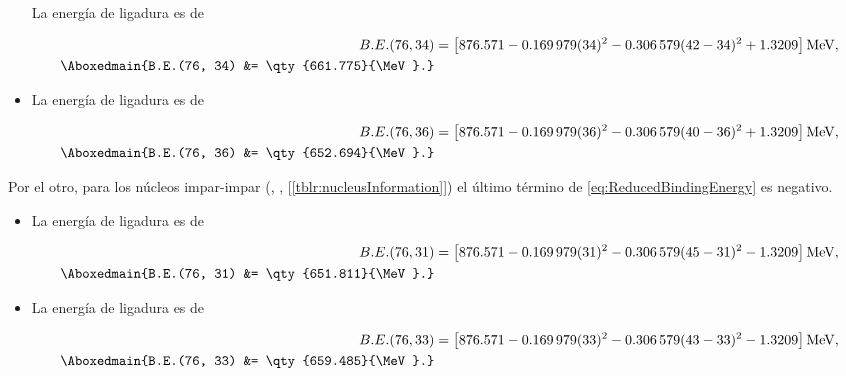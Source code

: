 \documentclass[./../main.tex]{subfiles}
\begin{document}
\begin{exercise}
\begin{solution}
\begin{itemize}
                La energía de ligadura es de

                \begin{align*}
                    B.E.(76, 34) &= \left[\num{876.571} - \num{0.169979}(34)^{2} - \num{0.306579}(42 - 34)^{2} + \num{1.3209}\right]\unit{\MeV},\\
                    \Aboxedmain{B.E.(76, 34) &= \qty{661.775}{\MeV}.}
                \end{align*}
                
                \item {}
                
                La energía de ligadura es de

                \begin{align*}
                    B.E.(76, 36) &= \left[\num{876.571} - \num{0.169979}(36)^{2} - \num{0.306579}(40 - 36)^{2} + \num{1.3209}\right]\unit{\MeV},\\
                    \Aboxedmain{B.E.(76, 36) &= \qty{652.694}{\MeV}.}
                \end{align*}
            \end{itemize}

            Por el otro, para los núcleos impar-impar (, ,  [\cref*{tblr:nucleusInformation}]) el último término de \cref{eq:ReducedBindingEnergy} es negativo.

            \begin{itemize}
                \item {}
                
                La energía de ligadura es de

                \begin{align*}
                    B.E.(76, 31) &= \left[\num{876.571} - \num{0.169979}(31)^{2} - \num{0.306579}(45 - 31)^{2} - \num{1.3209}\right]\unit{\MeV},\\
                    \Aboxedmain{B.E.(76, 31) &= \qty{651.811}{\MeV}.}
                \end{align*}
                
                \item {}
                
                La energía de ligadura es de

                \begin{align*}
                    B.E.(76, 33) &= \left[\num{876.571} - \num{0.169979}(33)^{2} - \num{0.306579}(43 - 33)^{2} - \num{1.3209}\right]\unit{\MeV},\\
                    \Aboxedmain{B.E.(76, 33) &= \qty{659.485}{\MeV}.}
                \end{align*}
                

\end{itemize}
\end{solution}
\end{exercise}
\end{document}
